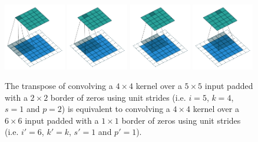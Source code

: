 \documentclass{report}
\begin{document}
\begin{figure}[p]
    \centering
    \includegraphics[width=0.24\textwidth]{pdf/arbitrary_padding_no_strides_transposed_00.pdf}
    \includegraphics[width=0.24\textwidth]{pdf/arbitrary_padding_no_strides_transposed_01.pdf}
    \includegraphics[width=0.24\textwidth]{pdf/arbitrary_padding_no_strides_transposed_02.pdf}
    \includegraphics[width=0.24\textwidth]{pdf/arbitrary_padding_no_strides_transposed_03.pdf}
    \caption{\label{fig:arbitrary_padding_no_strides_transposed} The transpose
        of convolving a $4 \times 4$ kernel over a $5 \times 5$ input padded
        with a $2 \times 2$ border of zeros using unit strides (i.e. $i = 5$,
        $k = 4$, $s = 1$ and $p = 2$) is equivalent to convolving a $4 \times 4$
        kernel over a $6 \times 6$ input padded with a $1 \times 1$ border of
        zeros using unit strides (i.e. $i' = 6$, $k' = k$, $s' = 1$ and $p' =
        1$).}
\end{figure}
\end{document}
